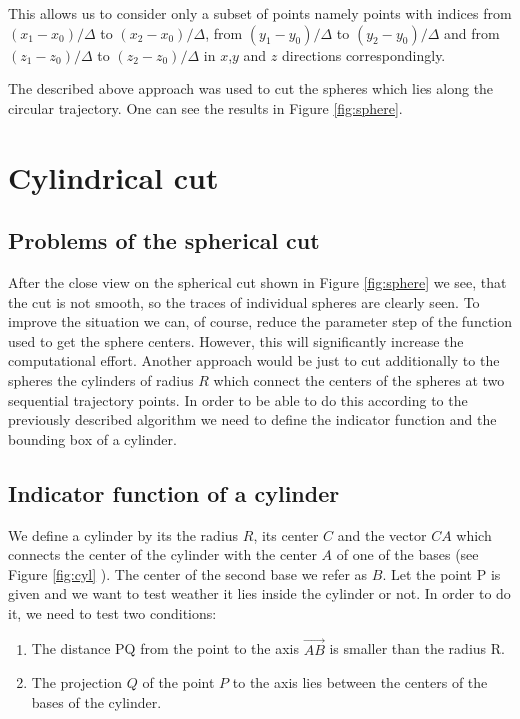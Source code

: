 \documentclass[12pt]{article}
\begin{document}
This allows us to consider only a subset of points namely points with indices 
from $(x_1 - x_0)/\Delta$ to $(x_2-x_0)/\Delta$, 
from $(y_1 - y_0)/\Delta$ to $(y_2-y_0)/\Delta$ 
and from $(z_1 - z_0)/\Delta$ to $(z_2-z_0)/\Delta$ in $x$,$y$ and $z$ directions correspondingly. 

The described above approach was used to cut the spheres which lies along the circular trajectory. One can see the results in Figure \ref{fig:sphere}.


\section{Cylindrical cut}


\subsection{Problems of the spherical cut}


After the close view on the spherical cut shown in Figure \ref{fig:sphere} we see, that the cut is not smooth, so the traces of individual spheres are clearly seen.
To improve the situation we can, of course, reduce the parameter step of the function used to get the sphere centers.
However, this will significantly increase the computational effort. 
Another approach would be just to cut additionally to the spheres the cylinders of radius $R$ which connect the centers of the spheres at two sequential trajectory points.
In order to be able to do this according to the previously described algorithm we need to define the indicator function and the bounding box of a cylinder.

\subsection{Indicator function of a cylinder }
We define a cylinder by its the radius $R$, its center $C$ and the vector $CA$ which connects the center of the cylinder with the center $A$ of one of the bases (see Figure \ref{fig:cyl} ).
The center of the second base we refer as $B$.
Let the point P is given and we want to test weather it lies inside the cylinder or not.
In order to do it, we need to test two conditions:
 \begin{enumerate}
   \item The distance PQ from the point to the axis $\vec{AB}$ is smaller than the radius R.
   \item The projection $Q$ of the point $P$ to the axis lies between the centers of the bases of the cylinder.
 \end{enumerate}
 
\end{document}
